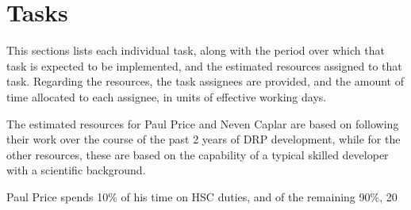 \section{Tasks}

This sections lists each individual task, along with the period over which that task is expected to be implemented, and the estimated resources assigned to that task. 
Regarding the resources, the task assignees are provided, and the amount of time allocated to each assignee, in units of effective working days.

The estimated resources for Paul Price and Neven Caplar are based on following their work over the course of the past 2 years of DRP development, while for the other
resources, these are based on the capability of a typical skilled developer with a scientific background. 

Paul Price spends 10\% of his time on HSC duties, and of the remaining 90\%, 20%


